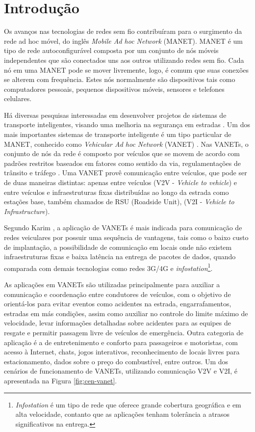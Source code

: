 \chapter{Introdução} \label{chapter:introducao}

Os  avanços nas  tecnologias  de  redes sem  fio  contribuíram para  o
surgimento  da rede  ad hoc  móvel,  do inglês  \textit{Mobile Ad  hoc
  Network} (MANET).  MANET é um tipo de rede autoconfigurável composta
por um conjunto de nós móveis independentes que são conectados uns aos
outros utilizando redes  sem fio.  Cada nó em uma  MANET pode se mover
livremente, logo, é comum que suas conexões se alterem com frequência.
Estes  nós   normalmente  são  dispositivos  tais   como  computadores
pessoais,   pequenos  dispositivos   móveis,   sensores  e   telefones
celulares.

Há diversas pesquisas interessadas em desenvolver projetos de sistemas
de  transporte  inteligentes, visando  uma  melhoria  na segurança  em
estradas  \cite{SINGH2015,tatari:2012}.    Um  dos   mais  importantes
sistemas  de transporte  inteligente é  um tipo  particular de  MANET,
conhecido   como    \textit{Vehicular   Ad   hoc    Network}   (VANET)
\cite{BITAM2013981}. Nas VANETs, o conjunto  de nós da rede é composto
por veículos que se movem de  acordo com padrões restritos baseados em
fatores como  sentido da  via, regulamentações  de trânsito  e tráfego
\cite{PLOL2008390}. Uma  VANET provê  comunicação entre  veículos, que
pode  ser de  duas maneiras  distintas: apenas  entre veículos  (V2V -
\textit{Vehicle to vehicle}) e  entre veículos e infraestruturas fixas
distribuídas ao longo  da estrada como estações  base, também chamados
de RSU (Roadside Unit), (V2I - \textit{Vehicle to Infrastructure}).

Segundo Karim \cite{karim:2008}, a aplicação de VANETs é mais indicada
para  comunicação de  redes veiculares  por possuir  uma sequência  de
vantagens, tais como o baixo  custo de implantação, a possibilidade de
comunicação em locais  onde não existem infraestruturas  fixas e baixa
latência na entrega  de pacotes de dados, quando  comparada com demais
tecnologias           como           redes           3G/4G           e
\textit{infostation}\footnote{\textit{Infostation} é  um tipo  de rede
que oferece grande cobertura geográfica e em alta velocidade, contanto
que  as  aplicações  tenham  tolerância a  atrasos  significativos  na
entrega.}.
 
As aplicações em VANETs são  utilizadas principalmente para auxiliar a
comunicação e coordenação entre condutores de veículos, com o objetivo
de  orientá-los  para  evitar   eventos  como  acidentes  na  estrada,
engarrafamentos,  estradas em  más condições,  assim como  auxiliar no
controle do limite máximo  de velocidade, levar informações detalhadas
sobre acidentes para  as equipes de resgate e  permitir passagem livre
de  veículos de  emergência.   Outra  categoria de  aplicação  é a  de
entretenimento e conforto para passageiros  e motoristas, com acesso à
Internet, chats,  jogos interativos,  reconhecimento de  locais livres
para estacionamento, dados sobre o preço do combustível, entre outros.
Um dos cenários de funcionamento de VANETs, utilizando comunicação V2V
e V2I, é apresentada na Figura \ref{fig:cen-vanet}.

